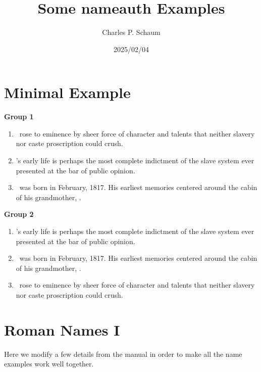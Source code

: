 \documentclass[oneside]{article}
\title{\bfseries Some \textsf{nameauth} Examples}
\author{Charles P. Schaum}
\date{2025/02/04}
\begin{document}
\maketitle

{}
\tableofcontents
\newpage

%
%

\section{Minimal Example}

\textbf{Group 1}
\begin{enumerate}
  \item[\textbf{1.}] \Doug\ rose to eminence by sheer force
    of character and talents that neither slavery nor caste
    proscription could crush.
  \item[\textbf{2.}] \Doug's early life is perhaps the most
    complete indictment of the slave system ever presented at
    the bar of public opinion.
  \item[\textbf{3.}] \Doug\ was born in February, 1817. His
    earliest memories centered around the cabin of his
    grandmother, \Bailey.
\end{enumerate}

\medskip\noindent\textbf{Group 2}
\begin{enumerate}
  \item[\textbf{2.}] \Doug's early life is perhaps the most
    complete indictment of the slave system ever presented at
    the bar of public opinion.
  \item[\textbf{3.}] \Doug\ was born in February, 1817. His
    earliest memories centered around the cabin of his
    grandmother, \Bailey.
  \item[\textbf{1.}] \Doug\ rose to eminence by sheer force
    of character and talents that neither slavery nor caste
    proscription could crush.
\end{enumerate}

%
%

\section{Roman Names I}

Here we modify a few details from the manual in order to make
all the name examples work well together.
\end{document}
